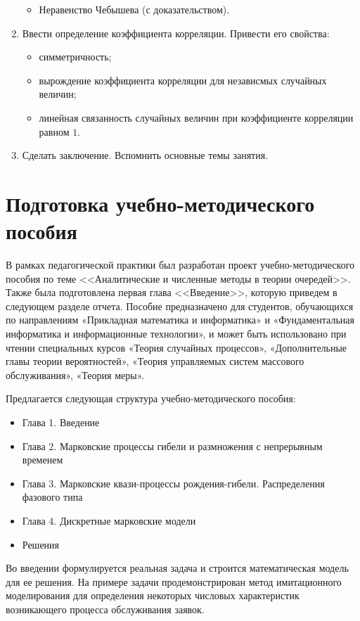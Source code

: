 \documentclass[14pt]{extarticle}
\theoremstyle{theorem}
\theoremstyle{remark}
\begin{document}
\begin{enumerate}
\begin{itemize}
        \item Неравенство Чебышева (с доказательством).
    \end{itemize}
    \item Ввести определение коэффициента корреляции. Привести его свойства:
    \begin{itemize}
        \item симметричность;
        \item вырождение коэффициента корреляции для независмых случайных величин;
        \item линейная связанность случайных величин при коэффициенте корреляции равном $1$.
    \end{itemize}
    \item Сделать заключение. Вспомнить основные темы занятия.
\end{enumerate}

\newpage
\section{Подготовка учебно-методического пособия}
В рамках педагогической практики был разработан проект учебно-методического пособия по теме <<Аналитические и численные методы в теории очередей>>. Также была подготовлена первая глава <<Введение>>, которую приведем в следующем разделе отчета. Пособие предназначено для студентов, обучающихся по направлениям «Прикладная математика и информатика» и «Фундаментальная информатика и информационные технологии», и может быть использовано при чтении специальных курсов «Теория случайных процессов», «Дополнительные главы теории вероятностей», «Теория управляемых систем массового обслуживания», «Теория меры».

Предлагается следующая структура учебно-методического пособия:
\begin{itemize}
    \item Глава 1. Введение
    \item Глава 2. Марковские процессы гибели и размножения с непрерывным временем
    \item Глава 3. Марковские квази-процессы рождения-гибели. Распределения фазового типа
    \item Глава 4. Дискретные марковские модели
    \item Решения
\end{itemize}

Во введении формулируется реальная задача и строится математическая модель для ее решения. На примере задачи продемонстрирован метод имитационного моделирования для определения некоторых числовых характеристик возникающего процесса обслуживания заявок. 
\end{document}
